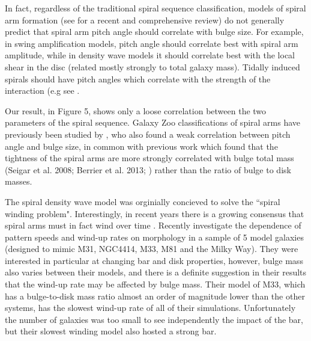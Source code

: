 \documentclass[usenatbib]{mn2e}
\begin{document}
 In fact, regardless of the traditional spiral sequence classification, models of spiral arm formation (see \citealt{DobbsBaba2014} for a recent and comprehensive review) do not generally predict that spiral arm pitch angle should correlate with bulge size. For example, in swing amplification models, pitch angle should correlate best with spiral arm amplitude, while in density wave models it should correlate best with the local shear in the disc (related mostly strongly to total galaxy mass). Tidally induced spirals should have pitch angles which correlate with the strength of the interaction (e.g see \citealt{Kendall2011}. %
 
 Our result, in Figure 5, shows only a loose correlation between the two parameters of the spiral sequence. Galaxy Zoo classifications of spiral arms have previously been studied by \citet{Hart2017b}, who also found a weak correlation between pitch angle and bulge size, in common with previous work which found that the tightness of the spiral arms are more strongly correlated with bulge total mass (Seigar et al. 2008; Berrier et al. 2013; \citealt{Davis2015}) rather than the ratio of bulge to disk masses. %

% 



The spiral density wave model \citet{LinShu1964} was orginially concieved to solve the ``spiral winding problem". Interestingly, in recent years there is a growing consensus that spiral arms must in fact wind over time \citep{2013ApJ...766...34D}. Recently \citet{PettittWadsley2018} investigate the dependence of pattern speeds and wind-up rates on morphology in a sample of 5 model galaxies (designed to mimic M31, NGC4414, M33, M81 and the Milky Way). They were interested in particular at changing bar and disk properties, however, bulge mass also varies between their models, and there is a definite suggestion in their results that the wind-up rate may be affected by bulge mass. Their model of M33, which has a bulge-to-disk mass ratio almost an order of magnitude lower than the other systems, has the slowest wind-up rate of all of their simulations. Unfortunately the number of galaxies was too small to see independently the impact of the bar, but their slowest winding model also hosted a strong bar.
\end{document}
